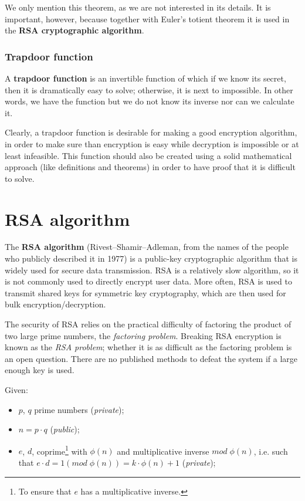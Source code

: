 We only mention this theorem, as we are not interested in its details. It is important, however, because together with Euler's totient theorem it is used in the \textbf{RSA cryptographic algorithm}.


\subsubsection{Trapdoor function}
A \textbf{trapdoor function} is an invertible function of which if we know its secret, then it is dramatically easy to solve; otherwise, it is next to impossible. In other words, we have the function but we do not know its inverse nor can we calculate it.

Clearly, a trapdoor function is desirable for making a good encryption algorithm, in order to make sure than encryption is easy while decryption is impossible or at least infeasible. This function should also be created using a solid mathematical approach (like definitions and theorems) in order to have proof that it is difficult to solve.


\section{RSA algorithm}
The \textbf{RSA algorithm} (Rivest–Shamir–Adleman, from the names of the people who publicly described it in 1977) is a public-key cryptographic algorithm that is widely used for secure data transmission. RSA is a relatively slow algorithm, so it is not commonly used to directly encrypt user data. More often, RSA is used to transmit shared keys for symmetric key cryptography, which are then used for bulk encryption/decryption.

The security of RSA relies on the practical difficulty of factoring the product of two large prime numbers, the \textit{factoring problem}. Breaking RSA encryption is known as the \textit{RSA problem}; whether it is as difficult as the factoring problem is an open question. There are no published methods to defeat the system if a large enough key is used.

\newpage

Given:

\begin{itemize}
    \item $p$, $q$ prime numbers (\textit{private});
    \item $n = p \cdot q$ (\textit{public});
    \item $e$, $d$, coprime\footnote{To ensure that $e$ has a multiplicative inverse.} with $\phi(n)$ and multiplicative inverse $mod\; \phi(n)$, i.e. such that $e \cdot d = 1 (mod\; \phi(n)) = k \cdot \phi(n) + 1$ (\textit{private});
\end{itemize}

